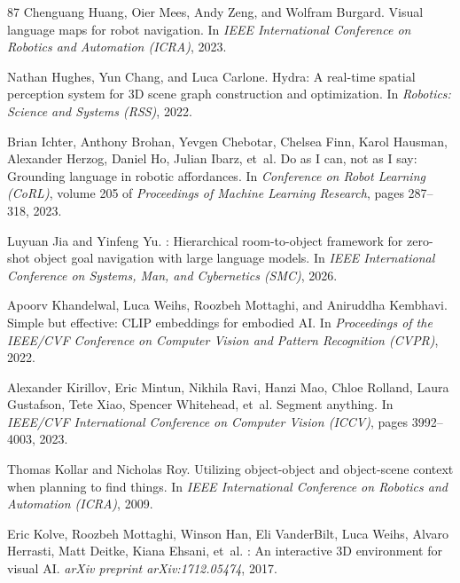 \documentclass[10pt]{article}
\begin{document}
\begin{thebibliography}{87}
Chenguang Huang, Oier Mees, Andy Zeng, and Wolfram Burgard.
\newblock Visual language maps for robot navigation.
\newblock In \emph{IEEE International Conference on Robotics and Automation (ICRA)}, 2023.

Nathan Hughes, Yun Chang, and Luca Carlone.
\newblock Hydra: A real-time spatial perception system for 3D scene graph construction and optimization.
\newblock In \emph{Robotics: Science and Systems (RSS)}, 2022.

Brian Ichter, Anthony Brohan, Yevgen Chebotar, Chelsea Finn, Karol Hausman, Alexander Herzog, Daniel Ho, Julian Ibarz, et~al.
\newblock Do as {I} can, not as {I} say: Grounding language in robotic affordances.
\newblock In \emph{Conference on Robot Learning (CoRL)}, volume 205 of \emph{Proceedings of Machine Learning Research}, pages 287--318, 2023.

Luyuan Jia and Yinfeng Yu.
: Hierarchical room-to-object framework for zero-shot object goal navigation with large language models.
\newblock In \emph{IEEE International Conference on Systems, Man, and Cybernetics (SMC)}, 2026.

Apoorv Khandelwal, Luca Weihs, Roozbeh Mottaghi, and Aniruddha Kembhavi.
\newblock Simple but effective: CLIP embeddings for embodied AI.
\newblock In \emph{Proceedings of the IEEE/CVF Conference on Computer Vision and Pattern Recognition (CVPR)}, 2022.

Alexander Kirillov, Eric Mintun, Nikhila Ravi, Hanzi Mao, Chloe Rolland, Laura Gustafson, Tete Xiao, Spencer Whitehead, et~al.
\newblock Segment anything.
\newblock In \emph{IEEE/CVF International Conference on Computer Vision (ICCV)}, pages 3992--4003, 2023.

Thomas Kollar and Nicholas Roy.
\newblock Utilizing object-object and object-scene context when planning to find things.
\newblock In \emph{IEEE International Conference on Robotics and Automation (ICRA)}, 2009.

Eric Kolve, Roozbeh Mottaghi, Winson Han, Eli VanderBilt, Luca Weihs, Alvaro Herrasti, Matt Deitke, Kiana Ehsani, et~al.
: An interactive {3D} environment for visual {AI}.
\newblock \emph{arXiv preprint arXiv:1712.05474}, 2017.


\end{thebibliography}
\end{document}
